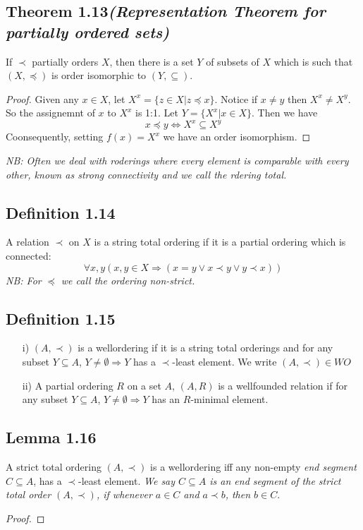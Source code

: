 \documentclass[a4paper, 12pt, twoside]{article}
\begin{document}
\subsection*{Theorem 1.13\textit{(Representation Theorem for partially ordered sets)}}
If $\prec$ partially orders $X$, then there is a set $Y$ of subsets of $X$ which is such that $(X,\preceq)$ is order isomorphic to $(Y,\subseteq)$.
\begin{proof}
    Given any $x\in X$, let $X^{x} = \{z\in X|z\preceq x\}$. Notice if $x\neq y$ then $X^{x}\neq X^{y}$. So the assignemnt of $x$ to $X^{x}$ is 1:1. Let $Y = \{X^{x}|x\in X\}$. Then we have
    $$x\preceq y \iff X^{x}\subseteq X^{y} $$
    Coonsequently, setting $f(x)=X^{x}$ we have an order isomorphism.
\end{proof}
\textit{NB: Often we deal with roderings where every element is  comparable with every other, known as \emph{strong connectivity} and we call the rdering \emph{total}.}
\subsection*{Definition 1.14}
A relation $\prec$ on $X$ is a string total ordering if it is a partial ordering which is connected:
$$\forall x,y (x,y\in X\Rightarrow (x=y\vee x\prec y\vee y\prec x)) $$
\textit{NB: For $\preceq$ we call the ordering non-strict.}
\subsection*{Definition 1.15}
\begin{itemize}
    \item[i)]$(A,\prec)$ is a wellordering if it is a string total orderings and for any subset $Y\subseteq A$, $Y\neq \emptyset\Rightarrow Y$ has a $\prec$-least element. We write $(A,\prec)\in WO$
    \item[ii)] A partial ordering $R$ on a set $A$, $(A,R)$ is a wellfounded relation if for any subset $Y\subseteq A$, $Y\neq \emptyset\Rightarrow Y$ has an $R$-minimal element.
\end{itemize}
\subsection*{Lemma 1.16}
A strict total ordering $(A,\prec)$ is a wellordering iff any non-empty \emph{end segment} $C\subseteq A$, has a $\prec$-least element.
\textit{We say $C\subseteq A$ is an end segment of the strict total order $(A,\prec)$, if whenever $a\in C$ and $a\prec b$, then $b\in C.$}
\begin{proof}

\end{proof}
\end{document}
